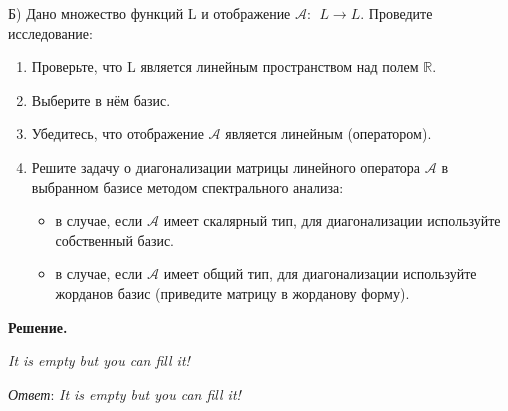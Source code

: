 Б) Дано множество функций  L  и отображение  $\mathcal{A}:\ \ L\rightarrow L$.
Проведите исследование:
\begin{enumerate}
	\item Проверьте, что  L  является линейным пространством над полем $\mathbb{R}$.
	\item Выберите в нём базис.
	\item Убедитесь, что отображение $\mathcal{A}$ является линейным (оператором).
	\item Решите задачу о диагонализации матрицы линейного оператора $\mathcal{A}$ в выбранном базисе методом спектрального анализа:
	\begin{itemize}
        \item в случае, если $\mathcal{A}$ имеет скалярный тип, для диагонализации используйте собственный базис.
        \item в случае, если $\mathcal{A}$ имеет общий тип, для диагонализации используйте жорданов базис (приведите матрицу в жорданову форму).
    \end{itemize}
\end{enumerate}

\vspace{10mm}

\textbf{Решение.}

\textit{It is empty but you can fill it!}

\textit{Ответ}: \textit{It is empty but you can fill it!}
